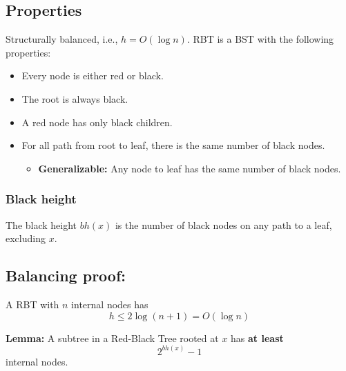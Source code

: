 \subsection{Properties}
\begin{definition}
    Structurally balanced, i.e., \( h = O(\log n) \). RBT is a BST with the following properties:
    \begin{itemize}
        \item Every node is either red or black.
        \item The root is always black.
        \item A red node has only black children.
        \item For all path from root to leaf, there is the same number of black nodes.
        \begin{itemize}
            \item \textbf{Generalizable:} Any node to leaf has the same number of black nodes. 
        \end{itemize}
    \end{itemize}
\end{definition}

\subsubsection{Black height}
\begin{definition}
    The black height \( bh(x) \) is the number of black nodes on any path to a leaf, excluding \( x \).
\end{definition}

\subsection{Balancing proof:}
\begin{theorem}
    A RBT with \( n \) internal nodes has 
    \begin{equation}
        h \leq 2 \log(n+1) = O(\log n)
    \end{equation}
\end{theorem}

\begin{theorem}
    \textbf{Lemma:} A subtree in a Red-Black Tree rooted at \( x \) has \textbf{at least}
    \begin{equation}
        2^{bh(x)} - 1
    \end{equation}
    internal nodes.
\end{theorem}

